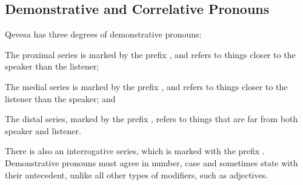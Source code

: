 \documentclass[grammar]{subfiles}
\begin{document}


  \subsection{Demonstrative and Correlative Pronouns}
  \label{ssec:nm_demonstrative_pronouns}

  Qevesa has three degrees of demonstrative pronouns:

  \begin{description}[style=nextline]
    \item[Proximal] The proximal series is marked by the prefix , and refers to things closer to the speaker than the listener;
    \item[Medial] The medial series is marked by the prefix , and refers to things closer to the listener than the speaker; and
    \item[Distal] The distal series, marked by the prefix , refers to things that are far from both speaker and listener.
  \end{description}

  There is also an interrogative series, which is marked with the prefix .  Demonstrative pronouns must agree in number, case and sometimes state with their antecedent, unlike all other types of modifiers, such as adjectives. 
\end{document}
